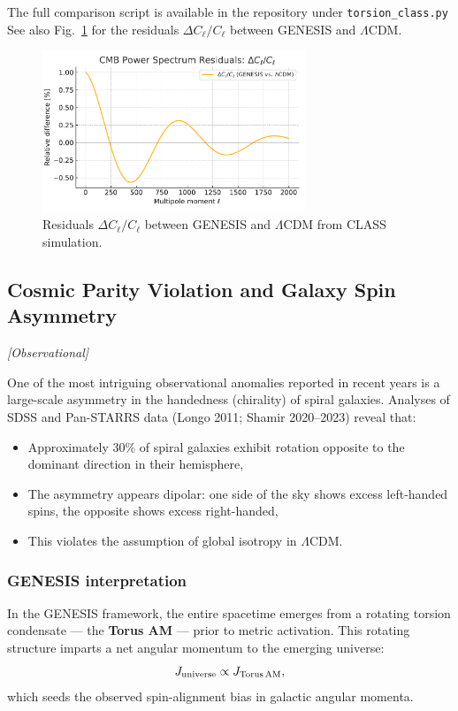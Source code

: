 \documentclass{article}
\newcommand{\obstag}{\textcolor{green!60!black}{\textit{[Observational]}}}
\begin{document}
\vspace{1ex}
\noindent
The full comparison script is available in the repository under \texttt{torsion\_class.py}
See also Fig.~\ref{fig:class_delta_cl} for the residuals $\Delta C_\ell / C_\ell$ between GENESIS and $\Lambda$CDM.


\begin{figure}[h!]
\centering
\includegraphics[width=0.7\textwidth]{class_delta_cl.pdf}
\caption{Residuals $\Delta C_\ell / C_\ell$ between GENESIS and $\Lambda$CDM from CLASS simulation.}
\label{fig:class_delta_cl}
\end{figure}


\subsection{ Cosmic Parity Violation and Galaxy Spin Asymmetry}
\label{sec:galaxy_spin_asymmetry}
\obstag

One of the most intriguing observational anomalies reported in recent years is a large-scale asymmetry in the handedness (chirality) of spiral galaxies. Analyses of SDSS and Pan-STARRS data (Longo 2011; Shamir 2020--2023) reveal that:
\begin{itemize}
  \item Approximately 30\% of spiral galaxies exhibit rotation opposite to the dominant direction in their hemisphere,
  \item The asymmetry appears dipolar: one side of the sky shows excess left-handed spins, the opposite shows excess right-handed,
  \item This violates the assumption of global isotropy in $\Lambda$CDM.
\end{itemize}

\subsubsection*{GENESIS interpretation}
In the GENESIS framework, the entire spacetime emerges from a rotating torsion condensate --- the \textbf{Torus AM} --- prior to metric activation. This rotating structure imparts a net angular momentum to the emerging universe:
\begin{equation}
J_{\rm universe} \propto J_{\rm Torus\,AM},
\end{equation}
which seeds the observed spin-alignment bias in galactic angular momenta.
\end{document}
